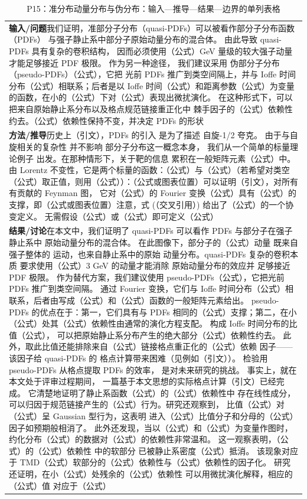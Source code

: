 \documentclass[UTF8,11pt,oneside]{ctexbook}
\begin{document}
\begin{table}[htbp]
  \centering
  \caption*{P15：准分布动量分布与伪分布：输入—推导—结果—边界的单列表格}
  \small
  \begin{tabular}{@{}p{}@{}}
    \toprule
    \textbf{输入/问题}\quad 我们证明，准部分子分布（quasi-PDFs）可以被看作部分子分布函数（PDFs） 与强子静止系中部分子原始动量分布的混合体。 由此导致 quasi-PDFs 具有复杂的卷积结构， 因而必须使用（公式）GeV 量级的较大强子动量 才能足够接近 PDF 极限。 作为另一种途径， 我们建议采用 伪部分子分布（pseudo-PDFs）（公式），它把 光前 PDFs 推广到类空间隔上，并与 Ioffe 时间分布（公式）相联系；后者是以 Ioffe 时间（公式）和距离参数（公式）为变量的函数，在小的（公式）下对（公式）表现出微扰演化。 在这种形式下，可以把来自原始静止系分布以及格点规范链接重正化中 棘手因子的（公式）依赖性约去。（公式）依赖性保持不变，并决定 PDFs 的形状 \\
    \textbf{方法/推导}\quad 历史上（引文），PDFs 的引入 是为了描述 自旋-1/2 夸克。 由于与自旋相关的复杂性 并不影响 部分子分布这一概念本身， 我们从一个简单的标量理论例子 出发。在那种情形下，关于靶的信息 累积在一般矩阵元素（公式）中。 由 Lorentz 不变性，它是两个标量的函数：（公式）与（公式）（若希望对类空（公式）取正值，则用（公式））：（公式或图表位置）可以证明（引文），对所有有贡献的 Feynman 图， 它对（公式）的 Fourier 变换（公式）具有（公式）的支撑，即（公式或图表位置）注意，式 (（交叉引用）) 给出了（公式）的一个协变定义。 无需假设（公式）或（公式）即可定义（公式） \\
    \textbf{结果/讨论}\quad 在本文中，我们证明了 quasi-PDFs 可以看作 PDFs 与部分子在强子静止系中 原始动量分布的混合体。 在此图像下，部分子的（公式）动量 既来自强子整体的 运动，也来自静止系中的原始 动量分布。quasi-PDFs 复杂的卷积本质 要求使用（公式）3 GeV 的动量才能消除 原始动量分布的效应并 足够接近 PDF 极限。 作为替代方案，我们建议使用 pseudo-PDFs（公式），它把光前 PDFs 推广到类空间隔。 通过 Fourier 变换，它们与 Ioffe 时间分布（公式）相联系，后者由写成（公式）和（公式）函数的一般矩阵元素给出。 pseudo-PDFs 的优点在于：第一，它们具有与 PDFs 相同的（公式）支撑；第二，在小（公式）处其（公式）依赖性由通常的演化方程支配。 构成 Ioffe 时间分布的比值（公式）， 可以把原始静止系分布产生的绝大部分（公式）依赖性约去。 此外，取此比值还能排除来自（公式）链接格点重正化的（公式）依赖 因子——该因子给 quasi-PDFs 的 格点计算带来困难（见例如（引文））。 检验用 pseudo-PDFs 从格点提取 PDFs 的效率， 是对未来研究的挑战。 事实上，就在本文处于评审过程期间， 一篇基于本文思想的实际格点计算（引文）已经完成。 它清楚地证明了静止系函数（公式）的（公式）依赖性中 存在线性成分，可以归因于规范链接产生的（公式）行为。研究还观察到， 比值（公式）对（公式）呈 Gaussian 型行为，这表明 进入（公式）比值分子和分母的（公式）因子如预期般相消了。 此外还发现，当以（公式）和（公式）为变量作图时， 约化分布（公式）的数据对（公式）的依赖性非常温和。 这一观察表明，（公式）的（公式）依赖性 中的软部分 已被静止系密度（公式）抵消。 该现象对应于 TMD（公式）软部分的（公式）依赖性与（公式）依赖性的因子化。 研究还证明，在小（公式）处残余的（公式）依赖性 可以用微扰演化解释，相应的（公式）值 对应于（公式） \\

\end{tabular}
\end{table}
\end{document}
